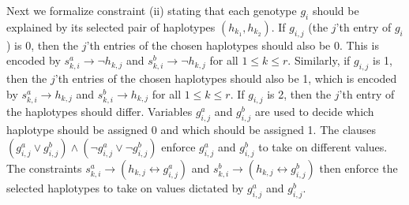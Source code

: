 \documentclass[12pt,a4paper]{article}
\begin{document}
Next we formalize constraint (ii) stating that each genotype $g_i$ should be explained by its selected pair of haplotypes $(h_{k_1}, h_{k_2})$.
If $g_{i,j}$ (the $j$'th entry of $g_i$) is 0, then the $j$'th entries of the chosen haplotypes should also be 0.
This is encoded by $s^a_{k,i}\rightarrow\neg h_{k,j}$ and $s^b_{k,i}\rightarrow\neg h_{k,j}$ for all $1\leq k \leq r$.
Similarly, if $g_{i,j}$ is 1, then the $j$'th entries of the chosen haplotypes should also be 1, which is encoded by $s^a_{k,i}\rightarrow h_{k,j}$ and $s^b_{k,i}\rightarrow h_{k,j}$ for all $1\leq k \leq r$.
If $g_{i,j}$ is 2, then the $j$'th entry of the haplotypes should differ.
Variables $g^a_{i,j}$ and $g^b_{i,j}$ are used to decide which haplotype should be assigned 0 and which should be assigned 1.
The clauses $(g^a_{i,j}\vee g^b_{i,j})\wedge(\neg g^a_{i,j}\vee \neg g^b_{i,j})$ enforce $g^a_{i,j}$ and $g^b_{i,j}$ to take on different values.
The constraints $s^a_{k,i}\rightarrow (h_{k,j}\leftrightarrow g^a_{i,j})$ and $s^b_{k,i}\rightarrow (h_{k,j}\leftrightarrow g^b_{i,j})$ then enforce the selected haplotypes to take on values dictated by $g^a_{i,j}$ and $g^b_{i,j}$.
\end{document}
